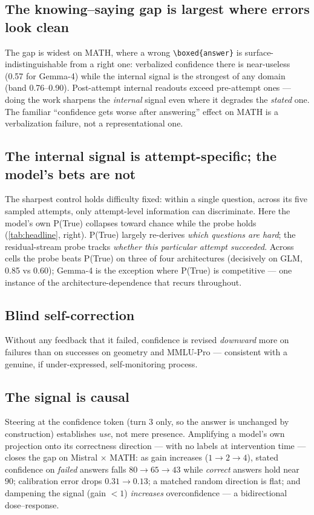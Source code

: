 \documentclass{article}
\begin{document}
\subsection{The knowing--saying gap is largest where errors look clean}

The gap is widest on MATH, where a wrong \texttt{\textbackslash boxed\{answer\}} is surface-indistinguishable from a right one: verbalized confidence there is near-useless (0.57 for Gemma-4) while the internal signal is the strongest of any domain (band 0.76--0.90).
Post-attempt internal readouts exceed pre-attempt ones --- doing the work sharpens the \emph{internal} signal even where it degrades the \emph{stated} one.
The familiar ``confidence gets worse after answering'' effect on MATH is a verbalization failure, not a representational one.

\subsection{The internal signal is attempt-specific; the model's bets are not}

The sharpest control holds difficulty fixed: within a single question, across its five sampled attempts, only attempt-level information can discriminate.
Here the model's own P(True) collapses toward chance while the probe holds (\cref{tab:headline}, right).
P(True) largely re-derives \emph{which questions are hard}; the residual-stream probe tracks \emph{whether this particular attempt succeeded}.
Across cells the probe beats P(True) on three of four architectures (decisively on GLM, 0.85 vs 0.60); Gemma-4 is the exception where P(True) is competitive --- one instance of the architecture-dependence that recurs throughout.

\subsection{Blind self-correction}

Without any feedback that it failed, confidence is revised \emph{downward} more on failures than on successes on geometry and MMLU-Pro --- consistent with a genuine, if under-expressed, self-monitoring process.

\subsection{The signal is causal}

Steering at the confidence token (turn 3 only, so the answer is unchanged by construction) establishes \emph{use}, not mere presence.
Amplifying a model's own projection onto its correctness direction --- with no labels at intervention time --- closes the gap on Mistral $\times$ MATH: as gain increases ($1\to2\to4$), stated confidence on \emph{failed} answers falls $80 \to 65 \to 43$ while \emph{correct} answers hold near $90$; calibration error drops $0.31 \to 0.13$; a matched random direction is flat; and dampening the signal (gain $<1$) \emph{increases} overconfidence --- a bidirectional dose--response.
\end{document}
